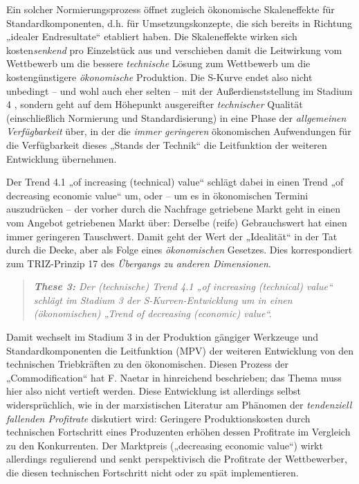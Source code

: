 \documentclass[12pt,a4paper]{article}
\begin{document}
Ein solcher Normierungsprozess öffnet zugleich ökonomische Skaleneffekte für
Standardkomponenten, d.h. für Umsetzungskonzepte, die sich bereits in Richtung
„idealer Endresultate“ etabliert haben. Die Skaleneffekte wirken sich
kosten\emph{senkend} pro Einzelstück aus und verschieben damit die Leitwirkung
vom Wettbewerb um die bessere \emph{technische} Lösung zum Wettbewerb um die
kostengünstigere \emph{ökonomische} Produktion.  Die S-Kurve endet also nicht
unbedingt -- und wohl auch eher selten -- mit der Außerdienststellung im
Stadium 4 \cite[S. 38]{TESE2018}, sondern geht auf dem Höhepunkt ausgereifter
\emph{technischer} Qualität (einschließlich Normierung und Standardisierung)
in eine Phase der \emph{allgemeinen Verfügbarkeit} über, in der die
\emph{immer geringeren} ökonomischen Aufwendungen für die Verfügbarkeit dieses
„Stands der Technik“ die Leitfunktion der weiteren Entwicklung übernehmen.

Der Trend 4.1 „of increasing (technical) value“ schlägt dabei in einen Trend
„of decreasing economic value“ um, oder -- um es in ökonomischen Termini
auszudrücken -- der vorher durch die Nachfrage getriebene Markt geht in einen
vom Angebot getriebenen Markt über: Derselbe (reife) Gebrauchswert hat einen
immer geringeren Tauschwert.  Damit geht der Wert der „Idealität“
\cite[Kap. 4.1.1]{KS2017} in der Tat durch die Decke, aber als Folge eines
\emph{ökonomischen} Gesetzes.  Dies korrespondiert zum TRIZ-Prinzip 17 des
\emph{Übergangs zu anderen Dimensionen}.
\begin{quote}\it
  \textbf{These 3:} Der (technische) Trend 4.1 „of increasing (technical)
  value“ schlägt im Stadium 3 der S-Kurven-Entwicklung um in einen
  (ökonomischen) „Trend of decreasing (economic) value“.
\end{quote}
Damit wechselt im Stadium 3 in der Produktion gängiger Werkzeuge und
Standardkomponenten die Leitfunktion (MPV) der weiteren Entwicklung von den
technischen Triebkräften zu den ökonomischen. Diesen Prozess der
„Commodification“ hat F. Naetar in \cite{Naetar2005} hinreichend beschrieben;
das Thema muss hier also nicht vertieft werden. Diese Entwicklung ist
allerdings selbst widersprüchlich, wie in der marxistischen Literatur am
Phänomen der \emph{tendenziell fallenden Profitrate} diskutiert wird:
Geringere Produktionskosten durch technischen Fortschritt eines Produzenten
erhöhen dessen Profitrate im Vergleich zu den Konkurrenten. Der Marktpreis
(„decreasing economic value“) wirkt allerdings regulierend und senkt
perspektivisch die Profitrate der Wettbewerber, die diesen technischen
Fortschritt nicht oder zu spät implementieren.
\end{document}
